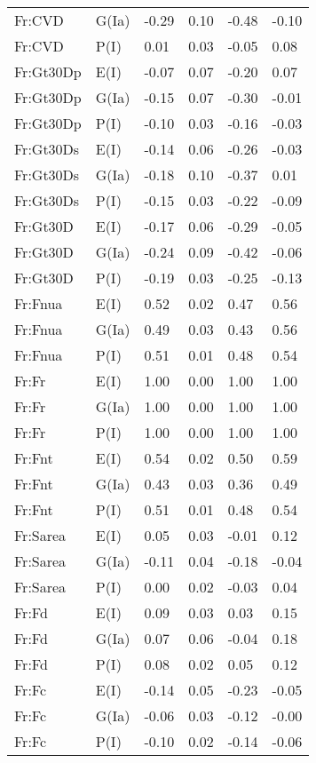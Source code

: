 \begin{center}
\begin{longtable}{|p{1.1in}|p{0.7in}|p{0.7in}|p{0.6in}|p{0.6in}|p{0.6in}|}
  Fr:CVD & G(Ia) & -0.29 & 0.10 & -0.48 & -0.10 \\ 
  Fr:CVD & P(I) & 0.01 & 0.03 & -0.05 & 0.08 \\ 
  Fr:Gt30Dp & E(I) & -0.07 & 0.07 & -0.20 & 0.07 \\ 
  Fr:Gt30Dp & G(Ia) & -0.15 & 0.07 & -0.30 & -0.01 \\ 
  Fr:Gt30Dp & P(I) & -0.10 & 0.03 & -0.16 & -0.03 \\ 
  Fr:Gt30Ds & E(I) & -0.14 & 0.06 & -0.26 & -0.03 \\ 
  Fr:Gt30Ds & G(Ia) & -0.18 & 0.10 & -0.37 & 0.01 \\ 
  Fr:Gt30Ds & P(I) & -0.15 & 0.03 & -0.22 & -0.09 \\ 
  Fr:Gt30D & E(I) & -0.17 & 0.06 & -0.29 & -0.05 \\ 
  Fr:Gt30D & G(Ia) & -0.24 & 0.09 & -0.42 & -0.06 \\ 
  Fr:Gt30D & P(I) & -0.19 & 0.03 & -0.25 & -0.13 \\ 
  Fr:Fnua & E(I) & 0.52 & 0.02 & 0.47 & 0.56 \\ 
  Fr:Fnua & G(Ia) & 0.49 & 0.03 & 0.43 & 0.56 \\ 
  Fr:Fnua & P(I) & 0.51 & 0.01 & 0.48 & 0.54 \\ 
  Fr:Fr & E(I) & 1.00 & 0.00 & 1.00 & 1.00 \\ 
  Fr:Fr & G(Ia) & 1.00 & 0.00 & 1.00 & 1.00 \\ 
  Fr:Fr & P(I) & 1.00 & 0.00 & 1.00 & 1.00 \\ 
  Fr:Fnt & E(I) & 0.54 & 0.02 & 0.50 & 0.59 \\ 
  Fr:Fnt & G(Ia) & 0.43 & 0.03 & 0.36 & 0.49 \\ 
  Fr:Fnt & P(I) & 0.51 & 0.01 & 0.48 & 0.54 \\ 
  Fr:Sarea & E(I) & 0.05 & 0.03 & -0.01 & 0.12 \\ 
  Fr:Sarea & G(Ia) & -0.11 & 0.04 & -0.18 & -0.04 \\ 
  Fr:Sarea & P(I) & 0.00 & 0.02 & -0.03 & 0.04 \\ 
  Fr:Fd & E(I) & 0.09 & 0.03 & 0.03 & 0.15 \\ 
  Fr:Fd & G(Ia) & 0.07 & 0.06 & -0.04 & 0.18 \\ 
  Fr:Fd & P(I) & 0.08 & 0.02 & 0.05 & 0.12 \\ 
  Fr:Fc & E(I) & -0.14 & 0.05 & -0.23 & -0.05 \\ 
  Fr:Fc & G(Ia) & -0.06 & 0.03 & -0.12 & -0.00 \\ 
  Fr:Fc & P(I) & -0.10 & 0.02 & -0.14 & -0.06 \\ 

\end{longtable}
\end{center}
